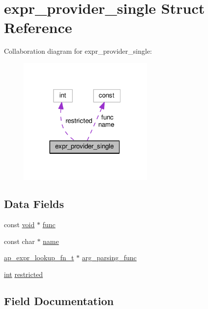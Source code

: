 \hypertarget{structexpr__provider__single}{}\section{expr\+\_\+provider\+\_\+single Struct Reference}
\label{structexpr__provider__single}


Collaboration diagram for expr\+\_\+provider\+\_\+single\+:
\nopagebreak
\begin{figure}[H]
\begin{center}
\leavevmode
\includegraphics[width=188pt]{structexpr__provider__single__coll__graph}
\end{center}
\end{figure}
\subsection*{Data Fields}
\begin{DoxyCompactItemize}
\item 
const \hyperlink{group__MOD__ISAPI_gacd6cdbf73df3d9eed42fa493d9b621a6}{void} $\ast$ \hyperlink{structexpr__provider__single_aa66257e8ff4f73f3ee1fc5a841e2d772}{func}
\item 
const char $\ast$ \hyperlink{structexpr__provider__single_a4d101e028d2ea3587c6fb8b0375d5f9b}{name}
\item 
\hyperlink{group__AP__EXPR_gad1cddcb03e188322dedbc6021e12f7ea}{ap\+\_\+expr\+\_\+lookup\+\_\+fn\+\_\+t} $\ast$ \hyperlink{structexpr__provider__single_af3f06e7a02fed423a9efec17bdbba7f2}{arg\+\_\+parsing\+\_\+func}
\item 
\hyperlink{pcre_8txt_a42dfa4ff673c82d8efe7144098fbc198}{int} \hyperlink{structexpr__provider__single_a50994346633fce0e53a1a9d76c7f81e0}{restricted}
\end{DoxyCompactItemize}


\subsection{Field Documentation}

